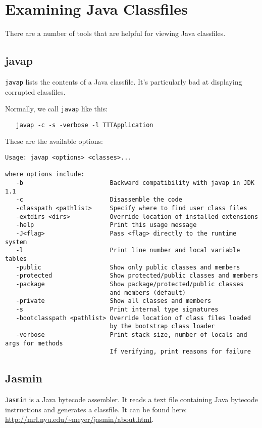 \section{Examining Java Classfiles}
There are a number of tools that are helpful for
viewing Java classfiles.

\subsection{javap}
{\tt javap} lists the contents of a Java classfile. 
It's particularly bad at displaying corrupted 
classfiles.

Normally, we call {\tt javap} like this:
\begin{verbatim}
   javap -c -s -verbose -l TTTApplication
\end{verbatim}

These are the available options:
\begin{verbatim}
Usage: javap <options> <classes>...

where options include:
   -b                        Backward compatibility with javap in JDK 1.1
   -c                        Disassemble the code
   -classpath <pathlist>     Specify where to find user class files
   -extdirs <dirs>           Override location of installed extensions
   -help                     Print this usage message
   -J<flag>                  Pass <flag> directly to the runtime system
   -l                        Print line number and local variable tables
   -public                   Show only public classes and members
   -protected                Show protected/public classes and members
   -package                  Show package/protected/public classes
                             and members (default)
   -private                  Show all classes and members
   -s                        Print internal type signatures
   -bootclasspath <pathlist> Override location of class files loaded
                             by the bootstrap class loader
   -verbose                  Print stack size, number of locals and args for methods
                             If verifying, print reasons for failure
\end{verbatim}

\subsection{Jasmin}
{\tt Jasmin} is a Java bytecode assembler. It reads
a text file containing Java bytecode instructions and
generates a classfile. It can be found here:
\url{http://mrl.nyu.edu/~meyer/jasmin/about.html}.

